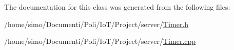 The documentation for this class was generated from the following files\+:\begin{DoxyCompactItemize}
\item 
/home/simo/\+Documenti/\+Poli/\+Io\+T/\+Project/server/\hyperlink{_timer_8h}{Timer.\+h}\item 
/home/simo/\+Documenti/\+Poli/\+Io\+T/\+Project/server/\hyperlink{_timer_8cpp}{Timer.\+cpp}\end{DoxyCompactItemize}
